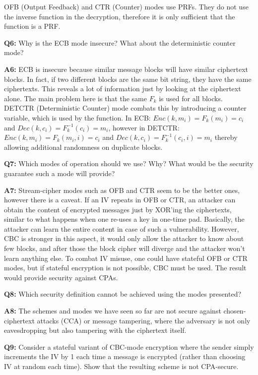 \documentclass[12pt,reqno]{amsart}
\begin{document}
OFB (Output Feedback) and CTR (Counter) modes use PRFs. They do not use the inverse function in the decryption, therefore it is only sufficient that the function is a PRF.

\vspace{20px}
\textbf{Q6:} Why is the ECB mode insecure? What about the deterministic counter mode?

\textbf{A6:} ECB is insecure because similar message blocks will have similar ciphertext blocks. In fact, if two different blocks are the same bit string, they have the same ciphertexts. This reveals a lot of information just by looking at the ciphertext alone. The main problem here is that the same $F_k$ is used for all blocks. DETCTR (Deterministic Counter) mode combats this by introducing a counter variable, which is used by the function. In ECB: $Enc(k,m_i)=F_k(m_i)=c_i$ and $Dec(k,c_i)=F_k^{-1}(c_i)=m_i$, however in DETCTR: $Enc(k,m_i)=F_k(m_i, i)=c_i$ and $Dec(k,c_i)=F_k^{-1}(c_i, i)=m_i$ thereby allowing additional randomness on duplicate blocks.

\vspace{20px}
\textbf{Q7:} Which modes of operation should we use? Why? What would be the security guarantee such a mode will provide?

\textbf{A7:} Stream-cipher modes such as OFB and CTR seem to be the better ones, however there is a caveat. If an IV repeats in OFB or CTR, an attacker can obtain the content of encrypted messages just by XOR'ing the ciphertexts, similar to what happens when one re-uses a key in one-time pad. Basically, the attacker can learn the entire content in case of such a vulnerability. However, CBC is stronger in this aspect, it would only allow the attacker to know about few blocks, and after those the block cipher will diverge and the attacker won't learn anything else. To combat IV misuse, one could have stateful OFB or CTR modes, but if stateful encryption is not possible, CBC must be used. The result would provide security against CPAs.

\vspace{20px}
\textbf{Q8:} Which security definition cannot be achieved using the modes presented?

\textbf{A8:} The schemes and modes we have seen so far are not secure against chosen-ciphertext attacks (CCA) or message tampering, where the adversary is not only eavesdropping but also tampering with the ciphertext itself.

\vspace{20px}
\textbf{Q9:} Consider a stateful variant of CBC-mode encryption where the sender simply increments the IV by 1 each time a message is encrypted (rather than choosing IV at random each time). Show that the resulting scheme is not CPA-secure.
\end{document}
